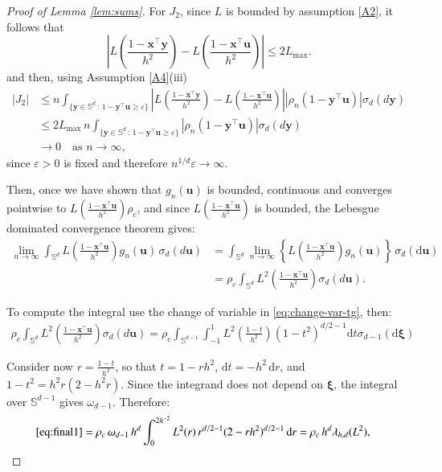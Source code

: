 \documentclass[12pt]{report} %
\newcommand{\bx}{\mathbf{x}}
\newcommand{\by}{\mathbf{y}}
\newcommand{\bu}{\boldsymbol{u}}
\newcommand{\bxi}{\boldsymbol{\xi}}
\newcommand{\sigmad}{\sigma_{d}}
\newcommand{\sigmadm}{\sigma_{d-1}}
\newcommand{\rd}{\mathrm{d}}
\newcommand{\Sd}{\mathbb{S}^{d}}
\newcommand{\Sdm}{\mathbb{S}^{d-1}}
\begin{document}
\begin{proof}[Proof of Lemma \ref{lem:sums}]
For $J_2$, since $L$ is bounded by assumption \ref{A2}, it follows that
\begin{equation*}
    \left|L\!\left(\frac{1-\bx^\top\by}{h^2}\right) 
    - L\!\left(\frac{1-\bx^\top\bu}{h^2}\right)\right| 
    \leq 2L_{\max}.
\end{equation*}
and then, using Assumption \ref{A4}(iii)
\begin{align*}
|J_2| &\leq n \int_{\{\by \in \Sd \,:\, 1 - \by^\top \bu \geq \varepsilon\}} 
\left| L\!\left(\frac{1 - \bx^\top \by}{h^2}\right) 
- L\!\left(\frac{1-\bx^\top\bu}{h^2}\right) \right|
\left|\rho_n\!\left(1 - \by^\top \bu\right) \right|\sigmad(d\by) \\
&\leq 2L_{\max}\, n 
\int_{\{\by \in \Sd \,:\, 1 - \by^\top \bu \geq \varepsilon\}} 
\left|\rho_n\!\left(1 - \by^\top \bu\right) \right|\sigmad(d\by) \\
&\longrightarrow 0 \quad \text{as } n \to \infty, 
\end{align*}
since $\varepsilon > 0$ is fixed and therefore $n^{1/d}\varepsilon \to \infty$. 

Then, once we have shown that $g_n(\bu)$ is bounded, continuous and converges pointwise to $L\!\left(\frac{1-\bx^\top\bu}{h^2}\right)\rho_c$, and since $L\!\left(\frac{1-\bx^\top\bu}{h^2}
\right)$ is bounded, the Lebesgue dominated convergence theorem gives: 
\begin{align*}
\lim_{n\to\infty}\int_{\Sd} L\!\left(\frac{1-\bx^\top\bu}{h^2}\right)
g_n(\bu)\,\sigmad(d\bu) 
&= \int_{\Sd} \lim_{n\to\infty} \left\{ L\!\left(\frac{1-\bx^\top\bu}{h^2}\right)
g_n(\bu)\right\}\,\sigmad(\rd\bu) \\
&= \rho_c\int_{\Sd} L^2\!\left(\frac{1-\bx^\top\bu}{h^2}\right)
\sigmad(d\bu).
\end{align*}

To compute the integral use the change of variable in \eqref{eq:change-var-tg}, then:
\begin{align}
\rho_c\int_{\Sd} L^2\!\left(\frac{1-\bx^\top\bu}{h^2}\right)\sigmad(d\bu) = \rho_c \int_{\Sdm} \int_{-1}^{1} L^2\!\left(\frac{1-t}{h^2}\right)\left(1-t^2\right)^{d/2-1} \rd t \sigmadm(\rd \bxi) \label{eq:final1}
\end{align}

Consider now $r = \frac{1-t}{h^2}$, so that $t = 1 - rh^2$, $\rd t = -h^2 \,\rd r$, and $1 - t^2 = h^2 r\left(2 - h^2 r\right)$. Since the integrand does not depend on $\bxi$, the integral over $\Sdm$ gives $\omega_{d-1}$. Therefore:
\begin{align*}
\eqref{eq:final1} 
&= \rho_c \,\omega_{d-1}\, h^{d} \int_{0}^{2h^{-2}} L^2(r)\, 
r^{d/2-1}(2 - rh^2)^{d/2-1} \,\rd r= \rho_c\, h^d \lambda_{h,d}(L^2),
\end{align*}


\end{proof}
\end{document}
